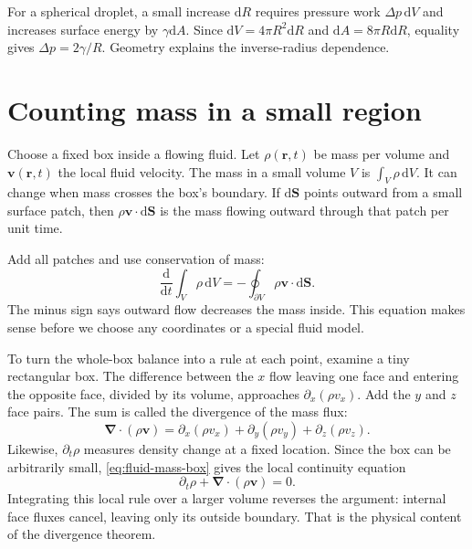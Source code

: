 \documentclass[11pt,oneside]{book}
\newcommand{\dd}{\mathrm{d}}
\newcommand{\vect}[1]{\boldsymbol{#1}}
\newcommand{\grad}{\boldsymbol{\nabla}}
\newcommand{\od}[2]{\frac{\dd #1}{\dd #2}}
\theoremstyle{reviewstyle}
\begin{document}
For a spherical droplet, a small increase $\dd R$ requires pressure work $\Delta p\,\dd V$ and increases surface energy by $\gamma\dd A$. Since $\dd V=4\pi R^2\dd R$ and $\dd A=8\pi R\dd R$, equality gives $\Delta p=2\gamma/R$. Geometry explains the inverse-radius dependence.

\section{Counting mass in a small region}
Choose a fixed box inside a flowing fluid. Let $\rho(\vect r,t)$ be mass per volume and $\vect v(\vect r,t)$ the local fluid velocity. The mass in a small volume $V$ is $\int_V\rho\,\dd V$. It can change when mass crosses the box's boundary. If $\dd\vect S$ points outward from a small surface patch, then $\rho\vect v\cdot\dd\vect S$ is the mass flowing outward through that patch per unit time.

Add all patches and use conservation of mass:
\begin{equation}
\od{}{t}\int_V\rho\,\dd V
=-\oint_{\partial V}\rho\vect v\cdot\dd\vect S.
\label{eq:fluid-mass-box}
\end{equation}
The minus sign says outward flow decreases the mass inside. This equation makes sense before we choose any coordinates or a special fluid model.

To turn the whole-box balance into a rule at each point, examine a tiny rectangular box. The difference between the $x$ flow leaving one face and entering the opposite face, divided by its volume, approaches $\partial_x(\rho v_x)$. Add the $y$ and $z$ face pairs. The sum is called the divergence of the mass flux:
\begin{equation}
\grad\cdot(\rho\vect v)
=\partial_x(\rho v_x)+\partial_y(\rho v_y)+\partial_z(\rho v_z).
\end{equation}
Likewise, $\partial_t\rho$ measures density change at a fixed location. Since the box can be arbitrarily small, \eqref{eq:fluid-mass-box} gives the local continuity equation
\begin{equation}
\partial_t\rho+\grad\cdot(\rho\vect v)=0.
\end{equation}
Integrating this local rule over a larger volume reverses the argument: internal face fluxes cancel, leaving only its outside boundary. That is the physical content of the divergence theorem.
\end{document}
